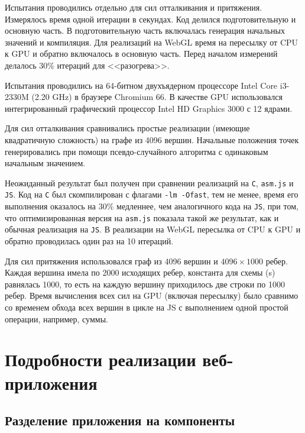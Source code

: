 Испытания проводились отдельно для сил отталкивания и притяжения. Измерялось время одной итерации в секундах. Код делился подготовительную и основную часть. В подготовительную часть включалась генерация начальных значений и компиляция. Для реализаций на WebGL время на пересылку от CPU к GPU и обратно включалось в основную часть. Перед началом измерений делалось $30\%$ итераций для <<разогрева>>.

Испытания проводились на 64-битном двухъядерном процессоре Intel Core i3-2330M (2.20 GHz) в браузере Chromium 66. В качестве GPU использовался интегрированный графический процессор Intel HD Graphics 3000 с 12 ядрами.

Для сил отталкивания сравнивались простые реализации (имеющие квадратичную сложность) на графе из 4096 вершин. Начальные положения точек генерировались при помощи псевдо-случайного алгоритма с одинаковым начальным значением.

Неожиданный результат был получен при сравнении реализаций на \texttt{C}, \texttt{asm.js} и \texttt{JS}. Код на \texttt{C} был скомпилирован с флагами \texttt{-lm -Ofast}, тем не менее, время его выполнения оказалось на $30\%$ медленнее, чем аналогичного кода на \texttt{JS}, при том, что оптимизированная версия на \texttt{asm.js} показала такой же результат, как и обычная реализация на \texttt{JS}. В реализации на WebGL пересылка от CPU к GPU и обратно проводилась один раз на 10 итераций.

Для сил притяжения использовался граф из 4096 вершин и $4096 \times 1000$ ребер. Каждая вершина имела по 2000 исходящих ребер, константа для схемы (s) равнялась 1000, то есть на каждую вершину приходилось две строки по 1000 ребер. Время вычисления всех сил на GPU (включая пересылку) было сравнимо со временем обхода всех вершин в цикле на JS с выполнением одной простой операции, например, суммы.

\chapter{Подробности реализации веб-приложения}

\section{Разделение приложения на компоненты}

